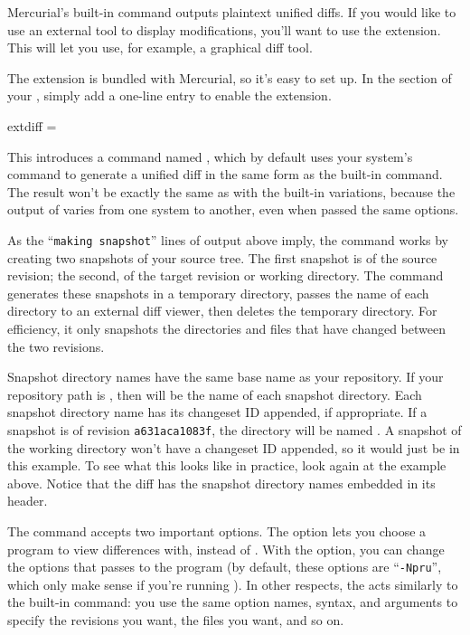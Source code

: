 Mercurial's built-in  command outputs plaintext unified
diffs.
If you would like to use an external tool to display modifications,
you'll want to use the  extension.  This will let you
use, for example, a graphical diff tool.

The  extension is bundled with Mercurial, so it's easy
to set up.  In the  section of your \hgrc,
simply add a one-line entry to enable the extension.
\begin{codesample2}
  [extensions]
  extdiff =
\end{codesample2}
This introduces a command named , which by default uses
your system's  command to generate a unified diff in the
same form as the built-in  command.  
The result won't be exactly the same as with the built-in 
variations, because the output of  varies from one
system to another, even when passed the same options.

As the ``\texttt{making snapshot}'' lines of output above imply, the
 command works by creating two snapshots of your source
tree.  The first snapshot is of the source revision; the second, of
the target revision or working directory.  The  command
generates these snapshots in a temporary directory, passes the name of
each directory to an external diff viewer, then deletes the temporary
directory.  For efficiency, it only snapshots the directories and
files that have changed between the two revisions.  

Snapshot directory names have the same base name as your repository.
If your repository path is , then 
will be the name of each snapshot directory.  Each snapshot directory
name has its changeset ID appended, if appropriate.  If a snapshot is
of revision \texttt{a631aca1083f}, the directory will be named
.  A snapshot of the working directory won't
have a changeset ID appended, so it would just be  in
this example.  To see what this looks like in practice, look again at
the  example above.  Notice that the diff has the
snapshot directory names embedded in its header.

The  command accepts two important options.  The
 option lets you choose a program to view
differences with, instead of .  With the
 option, you can change the options that
 passes to the program (by default, these options are
``\texttt{-Npru}'', which only make sense if you're running
).  In other respects, the  acts
similarly to the built-in  command: you use the same
option names, syntax, and arguments to specify the revisions you want,
the files you want, and so on.


